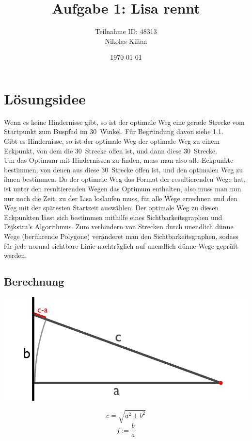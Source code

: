 \documentclass[12pt]{article}
\title{\vspace{-2.0cm}Aufgabe 1: Lisa rennt}
\author{Teilnahme ID: 48313\\Nikolas Kilian}
\date{\today}
\begin{document}
\maketitle
\tableofcontents

\section{Lösungsidee}
Wenn es keine Hindernisse gibt, so ist der optimale Weg eine gerade Strecke vom Startpunkt zum Buspfad im 30\degree\ Winkel. Für Begründung davon siehe 1.1.\\
Gibt es Hindernisse, so ist der optimale Weg der optimale Weg zu einem Eckpunkt, von dem die 30\degree\ Strecke offen ist, und dann diese 30\degree\ Strecke.\\
Um das Optimum mit Hindernissen zu finden, muss man also alle Eckpunkte bestimmen, von denen aus diese 30\degree\ Strecke offen ist, und den optimalen Weg zu ihnen bestimmen. Da der optimale Weg das Format der resultierenden Wege hat, ist unter den resultierenden Wegen das Optimum enthalten, also muss man nun nur noch die Zeit, zu der Lisa loslaufen muss, für alle Wege errechnen und den Weg mit der spätesten Startzeit auswählen.
Der optimale Weg zu diesen Eckpunkten lässt sich bestimmen mithilfe eines Sichtbarkeitsgraphen und Dijkstra's Algorithmus. Zum verhindern von Strecken durch unendlich dünne Wege (berührende Polygone) veränderet man den Sichtbarkeitsgraphen, sodass für jede normal sichtbare Linie nachträglich auf unendlich dünne Wege geprüft werden.

\subsection{Berechnung}
\newcommand{\vb}{v_{Bus}}
\newcommand{\vl}{v_{Lisa}}

\newcommand{\x}{x}

\renewcommand{\a}{a}
\renewcommand{\b}{b}
\renewcommand{\c}{c}

\newcommand{\f}{f}
\newcommand{\fzero}{f_0}

\newcommand{\tf}{t(\f)}
\newcommand{\tfzero}{t(\fzero)}
\newcommand{\df}[1]{\frac{d#1}{d\f}}
\newcommand{\dtf}{\df{\tf}}
\newcommand{\dtfzero}{\df{\tfzero}}

\begin{minipage}{0.8\textwidth}
\includegraphics[scale=0.4]{CalcLabel}
\end{minipage}
\begin{minipage}{0.15\textwidth}
\vspace{-1cm}
\[\c=\sqrt{\a^2+\b^2}\]
\[\f:=\frac{\b}{\a}\]%
\end{minipage}
\end{document}
